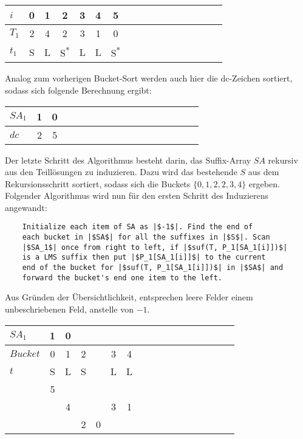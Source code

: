 \begin{center}
  \begin{tabular}{ | l | c | c | c | c | c | c | c | c | c | c | c | c | c | c | c | c | }
    \hline
        $i$ & 0 & 1 & 2 & 3 & 4 & 5 \\ \hline
      $T_1$ & 2 & 4 & 2 & 3 & 1 & 0  \\ \hline
      $t_1$ & S & L & S\textsuperscript{*} & L & L & S\textsuperscript{*} \\
    \hline
  \end{tabular}
\end{center}
\bigskip

\noindent Analog zum vorherigen Bucket-Sort werden auch hier die dc-Zeichen sortiert, sodass sich folgende Berechnung ergibt:

\begin{center}
  \begin{tabular}{ | l | c | c | c | c | c | c | c | c | c | c | c | c | c | c | c | c | }
    \hline
        $SA_1$ & 1 & 0 \\ \hline
        $dc$ & 2 & 5 \\
    \hline
  \end{tabular}
\end{center}
\bigskip

\noindent Der letzte Schritt des Algorithmus besteht darin, das Suffix-Array $SA$ rekursiv aus den Teillösungen zu induzieren. Dazu wird das bestehende $S$ aus dem Rekursionsschritt sortiert, sodass sich die Buckets $\{0,1,2,2,3,4\}$ ergeben. Folgender Algorithmus wird nun für den ersten Schritt des Induzierens angewandt\cite[ch.~4.5]{saca:6}:
\begin{verbatim}
    Initialize each item of SA as |$-1$|. Find the end of
    each bucket in |$SA$| for all the suffixes in |$S$|. Scan
    |$SA_1$| once from right to left, if |$suf(T, P_1[SA_1[i]])$|
    is a LMS suffix then put |$P_1[SA_1[i]]$| to the current
    end of the bucket for |$suf(T, P_1[SA_1[i]])$| in |$SA$| and
    forward the bucket's end one item to the left.
\end{verbatim}
Aus Gründen der Übersichtlichkeit, entsprechen leere Felder einem unbeschriebenen Feld, anstelle von $-1$.

\begin{center}
  \begin{tabular}{ | l | c | c | c | c | c | c | c | c | c | c | c | c | c | c | c | c | }
    \hline
     $SA_1$ & 1 & 0 & & & & \\ \hline
   $Bucket$ & 0 & 1 & \multicolumn{1}{c}{2} & & 3 & 4 \\ \hline
      $t$   & S & L & \multicolumn{1}{c}{S} & & L & L \\ \hline
            & 5 & & & & &  \\ \hline
            & & 4 & & & 3 & 1 \\ \hline
            & & & 2 & 0 & & \\
    \hline
  \end{tabular}
\end{center}
\bigskip

